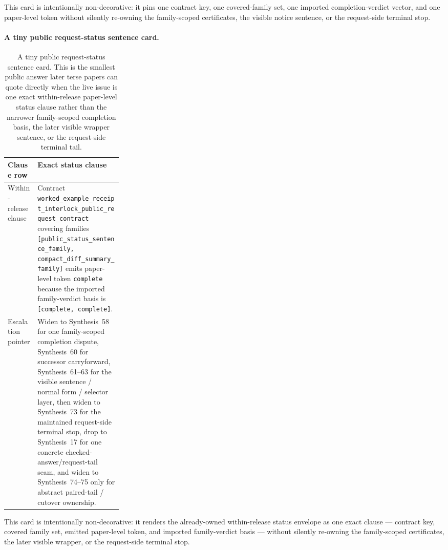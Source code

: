 \documentclass[11pt]{article}
\begin{document}
This card is intentionally non-decorative: it pins one contract key, one covered-family set, one imported completion-verdict vector, and one paper-level token without silently re-owning the family-scoped certificates, the visible notice sentence, or the request-side terminal stop.\cite{series:workedexample}

\paragraph{A tiny public request-status sentence card.}
\begin{table}[t]
\centering
\small
\begin{tabularx}{0.97\linewidth}{@{}p{0.26\linewidth}X@{}}
\toprule
\textbf{Clause row} & \textbf{Exact status clause}\\
\midrule
Within-release clause & Contract \nolinkurl{worked\_example\_receipt\_interlock\_public\_request\_contract} covering families \nolinkurl{[public\_status\_sentence\_family, compact\_diff\_summary\_family]} emits paper-level token \texttt{complete} because the imported family-verdict basis is \nolinkurl{[complete, complete]}. \\
Escalation pointer & Widen to Synthesis~58 for one family-scoped completion dispute, Synthesis~60 for successor carryforward, Synthesis~61--63 for the visible sentence / normal form / selector layer, then widen to Synthesis~73 for the maintained request-side terminal stop, drop to Synthesis~17 for one concrete checked-answer/request-tail seam, and widen to Synthesis~74--75 only for abstract paired-tail / cutover ownership. \\
\bottomrule
\end{tabularx}
\caption{A tiny public request-status sentence card. This is the smallest public answer later terse papers can quote directly when the live issue is one exact within-release paper-level status clause rather than the narrower family-scoped completion basis, the later visible wrapper sentence, or the request-side terminal tail.}
\label{tab:public-request-status-sentence-card}
\end{table}

This card is intentionally non-decorative: it renders the already-owned within-release status envelope as one exact clause --- contract key, covered family set, emitted paper-level token, and imported family-verdict basis --- without silently re-owning the family-scoped certificates, the later visible wrapper, or the request-side terminal stop.\cite{series:workedexample}
\end{document}
